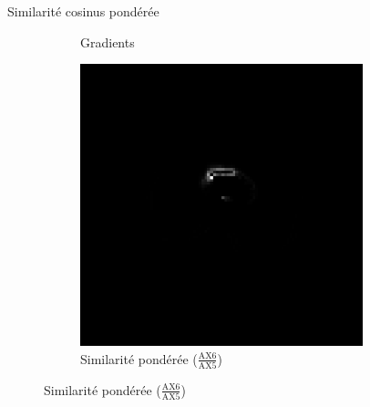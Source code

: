 \documentclass[10pt]{beamer}
\begin{document}
\begin{frame}{Similarité cosinus pondérée}
\begin{figure}[ht]
\begin{subfigure}[t]{0.33\textwidth}
      \caption{Gradients}
      \label{subfig:mri_slice8_sobel}
    \end{subfigure}%
    \begin{subfigure}[t]{0.33\textwidth}
      \centering
      \includegraphics[width=0.9\textwidth]{fig/cosine_diffweight}
      \caption{Similarité pondérée ($\frac{\text{AX6}}{\text{AX5}}$)}
      \label{subfig:cosine_diffweight}
    \end{subfigure}%

  \end{figure}


 
\end{frame}
\end{document}
